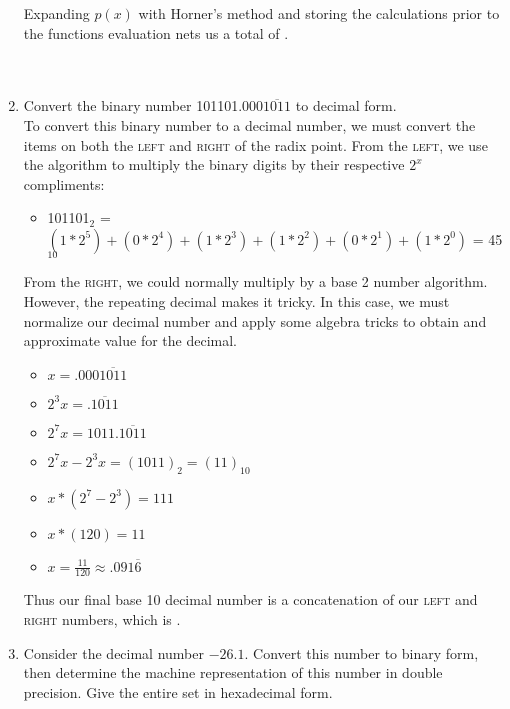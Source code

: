 \documentclass[12pt]{article}
\begin{document}
\begin{enumerate}
Expanding \(p(x)\) with Horner's method and storing the calculations prior to the functions evaluation nets us a total of .\\ \\ \\

	\item Convert the binary number 101101.000$\overline{1011}$ to decimal form. \\
	
	To convert this binary number to a decimal number, we must convert the items on both the \textsc{left} and \textsc{right} of the radix point. From the \textsc{left}, we use the algorithm to multiply the binary digits by their respective \(2^x\) compliments: 
	
	\begin{itemize}
		\item[] 101101$_2$ = $(1*2^5) + (0*2^4) + (1*2^3) + (1*2^2) + (0*2^1) + (1*2^0)$ = 45$_{10}$
	\end{itemize}
	
From the \textsc{right}, we could normally multiply by a base 2 number algorithm. However, the repeating decimal makes it tricky. In this case, we must normalize our decimal number and apply some algebra tricks to obtain and approximate value for the decimal.

	\begin{itemize}
		\item[] $x = .000\overline{1011}$
		\item[] $2^3x = .\overline{1011}$
		\item[] $2^7x = 1011.\overline{1011}$
		\item[] $2^7x - 2^3x = (1011)_2 = (11)_{10}$
		\item[] $x*(2^7 - 2^3) = 111$
		\item[] $x*(120)= 11$
		\item[] $x = \frac{11}{120} \approx .091\overline{6}$
	\end{itemize}
	
Thus our final base 10 decimal number is a concatenation of our \textsc{left} and \textsc{right} numbers, which is .\\

	\item Consider the decimal number $-26.1$. Convert this number to binary form, then determine the machine representation of this number in double precision. Give the entire set in hexadecimal form. \\
	

\end{enumerate}
\end{document}
